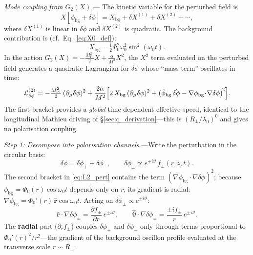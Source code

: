 \documentclass[11pt]{article}
\begin{document}
\textit{Mode coupling from $G_2(X)$.}---%
The kinetic variable for the perturbed field is
\begin{equation}
  X[\phi_{\mathrm{bg}} + \delta\phi]
  = X_{\mathrm{bg}}
  + \delta X^{(1)} + \delta X^{(2)} + \cdots,
\end{equation}
where $\delta X^{(1)}$ is linear in $\delta\phi$
and $\delta X^{(2)}$ is quadratic.  The
background contribution is
(cf.~Eq.~\ref{eq:X0_def}):
\begin{equation}\label{eq:Xbg_torsion}
  X_{\mathrm{bg}}
  = \tfrac{1}{2}\Phi_0^2\omega_0^2
  \sin^2(\omega_0 t).
\end{equation}
In the action $G_2(X)
= -\tfrac{M_{\mathrm{Pl}}^2}{2}X
+ \tfrac{\alpha}{M^2}X^2$,
the $X^2$ term evaluated on the perturbed field
generates a quadratic Lagrangian for $\delta\phi$
whose ``mass term'' oscillates in time:
\begin{equation}\label{eq:L2_pert}
  \mathcal{L}^{(2)}_{\delta\phi}
  = -\tfrac{M_{\mathrm{Pl}}^2}{2}\,
  (\partial_\mu\delta\phi)^2
  + \frac{2\alpha}{M^2}
  \Bigl[
    2\,X_{\mathrm{bg}}\,
    (\partial_\mu\delta\phi)^2
    + \bigl(
      \dot\phi_{\mathrm{bg}}\,\dot{\delta\phi}
      - \nabla\phi_{\mathrm{bg}}\!\cdot\!
      \nabla\delta\phi
    \bigr)^{\!2}
  \Bigr].
\end{equation}
The first bracket provides a \emph{global}
time-dependent effective speed, identical to
the longitudinal Mathieu driving of
\S\ref{sec:q_derivation}---this is
$(R_\perp/\lambda_0)^0$ and gives no polarisation
coupling.

\textit{Step 1: Decompose into polarisation
channels.}---Write the perturbation in the
circular basis:
\begin{equation}\label{eq:delta_phi_pm}
  \delta\phi = \delta\phi_+
  + \delta\phi_-,\qquad
  \delta\phi_\pm \propto
  e^{\pm i\vartheta}\,f_\pm(r,z,t).
\end{equation}
The second bracket in \eqref{eq:L2_pert}
contains the term
$(\nabla\phi_{\mathrm{bg}}\!\cdot\!
\nabla\delta\phi)^2$; because
$\phi_{\mathrm{bg}} = \Phi_0(r)\cos\omega_0 t$
depends only on $r$, its gradient is radial:
$\nabla\phi_{\mathrm{bg}} = \Phi_0'(r)\,
\hat{\mathbf{r}}\cos\omega_0 t$.
Acting on $\delta\phi_\pm \propto
e^{\pm i\vartheta}$:
\begin{equation}\label{eq:grad_coupling}
  \hat{\mathbf{r}}\cdot\nabla\delta\phi_\pm
  = \frac{\partial f_\pm}{\partial r}\,
  e^{\pm i\vartheta},
  \qquad
  \hat{\boldsymbol{\vartheta}}\cdot
  \nabla\delta\phi_\pm
  = \frac{\pm i f_\pm}{r}\,
  e^{\pm i\vartheta}.
\end{equation}
The \textbf{radial} part
($\partial_r f_\pm$) couples $\delta\phi_+$ and
$\delta\phi_-$ only through terms proportional
to $\Phi_0'(r)^2 / r^2$---the gradient of the
background oscillon profile evaluated at the
transverse scale $r \sim R_\perp$.
\end{document}
